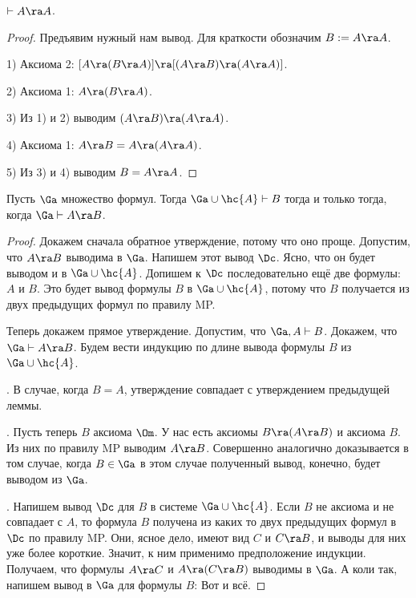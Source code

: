 \documentclass[a4paper,draft]{article}
\begin{document}
\begin{lemma}
$\vdash A \ra A$.
\end{lemma}
\begin{proof}
  Предъявим нужный нам вывод. Для краткости обозначим $B := A \ra A$.

  1) Аксиома 2: $[A \ra (B\ra A)] \ra [(A \ra B) \ra (A \ra A)]$.

  2) Аксиома 1: $A \ra (B\ra A)$.

  3) Из 1) и 2) выводим $(A \ra B) \ra (A\ra A)$.

  4) Аксиома 1: $A \ra B = A \ra (A \ra A)$.

  5) Из 3) и 4) выводим $B = A \ra A$.
\end{proof}

\begin{theorem}
  Пусть $\Ga$ множество формул. Тогда $\Ga \cup \hc{A} \vdash B$
  тогда и только тогда, когда $\Ga \vdash A \ra B$.
\end{theorem}
\begin{proof}
  Докажем сначала обратное утверждение, потому что оно проще.
  Допустим, что $A \ra B$ выводима в $\Ga$. Напишем этот вывод $\Dc$. Ясно, что он будет выводом и в $\Ga \cup \hc{A}$.
  Допишем к $\Dc$ последовательно ещё две формулы: $A$ и $B$. Это будет вывод формулы $B$ в $\Ga\cup \hc{A}$, потому что
  $B$ получается из двух предыдущих формул по правилу MP.

  Теперь докажем прямое утверждение. Допустим, что $\Ga, A \vdash B$. Докажем, что $\Ga \vdash A \ra B$.
  Будем вести индукцию по длине вывода формулы $B$ из $\Ga \cup\hc{A}$.

  . В случае, когда $B = A$, утверждение совпадает
  с утверждением предыдущей леммы.

  . Пусть теперь $B$ аксиома $\Om$. У нас есть аксиомы $B \ra (A \ra B)$ и аксиома $B$. Из них по правилу MP выводим $A \ra B$.
  Совершенно аналогично доказывается в том случае, когда $B \in \Ga$ в этом случае полученный вывод, конечно, будет выводом из $\Ga$.

  . Напишем вывод $\Dc$ для $B$ в системе $\Ga \cup \hc{A}$.
  Если $B$ не аксиома и не совпадает с $A$, то формула $B$
  получена из каких то двух предыдущих формул в $\Dc$ по правилу MP.
  Они, ясное дело, имеют вид $C$ и $C \ra B$, и выводы для них уже более короткие.
  Значит, к ним применимо предположение индукции. Получаем, что формулы
  $A \ra C$ и $A \ra (C \ra B)$ выводимы в $\Ga$. А коли так, напишем вывод в $\Ga$ для формулы $B$:
  \eqn{\begin{aligned}
    &\left[
    \mat{\vdots\\A \ra C}
    \right\}
    \text{ вывод } A\ra C,\\
    &\left[
    \mat{\vdots\\A \ra (C\ra B)}
    \right\}
    \text{ вывод } A\ra (C\ra B),\\
    &[A \ra (C\ra B)] \ra [(A \ra C) \ra (A \ra B)] \text{ аксиома 2,}\\
    &(A \ra C) \ra (A \ra B) \text{ MP,}\\
    &A \ra B \text{ MP.}
  \end{aligned}}
  Вот и всё.
\end{proof}
\end{document}
